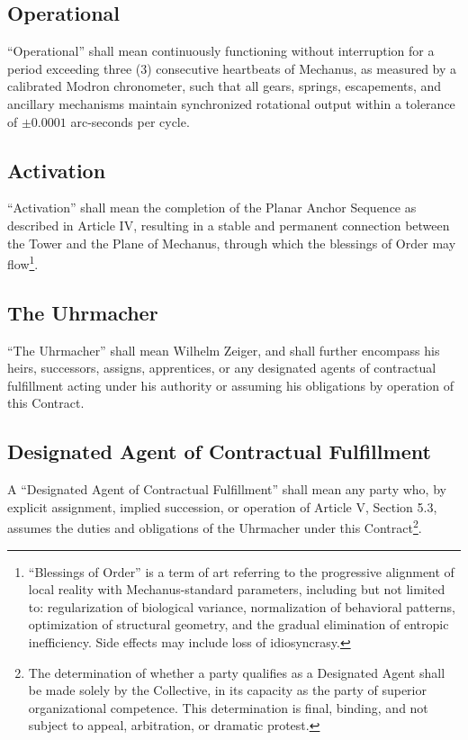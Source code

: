 \documentclass[12pt]{article}
\begin{document}
\subsection{Operational}
``Operational'' shall mean continuously functioning without interruption
for a period exceeding three (3) consecutive heartbeats of Mechanus,
as measured by a calibrated Modron chronometer, such that all gears,
springs, escapements, and ancillary mechanisms maintain synchronized
rotational output within a tolerance of $\pm 0.0001$ arc-seconds per
cycle.

\subsection{Activation}
``Activation'' shall mean the completion of the Planar Anchor Sequence
as described in Article IV, resulting in a stable and permanent
connection between the Tower and the Plane of Mechanus, through which
the blessings of Order may flow\footnote{``Blessings of Order'' is a
term of art referring to the progressive alignment of local reality
with Mechanus-standard parameters, including but not limited to:
regularization of biological variance, normalization of behavioral
patterns, optimization of structural geometry, and the gradual
elimination of entropic inefficiency. Side effects may include loss of
idiosyncrasy.}.

\subsection{The Uhrmacher}
``The Uhrmacher'' shall mean Wilhelm Zeiger, and shall further
encompass his heirs, successors, assigns, apprentices, or any
designated agents of contractual fulfillment acting under his
authority or assuming his obligations by operation of this Contract.

\subsection{Designated Agent of Contractual Fulfillment}
A ``Designated Agent of Contractual Fulfillment'' shall mean any
party who, by explicit assignment, implied succession, or operation of
Article V, Section 5.3, assumes the duties and obligations of the
Uhrmacher under this Contract\footnote{The determination of whether a
party qualifies as a Designated Agent shall be made solely by the
Collective, in its capacity as the party of superior organizational
competence. This determination is final, binding, and not subject to
appeal, arbitration, or dramatic protest.}.
\end{document}
